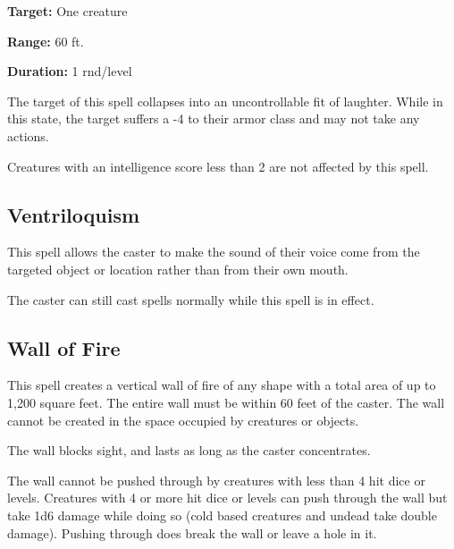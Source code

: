 \begin{multicols*}{2}
{\textbf{Target:} One creature

\textbf{Range:} 60 ft.

\textbf{Duration:} 1 rnd/level}

The target of this spell collapses into an uncontrollable fit of laughter. While in this state, the target suffers a -4 to their armor class and may not take any actions.

Creatures with an intelligence score less than 2 are not affected by this spell.

\subsection{Ventriloquism}\label{spell:Ventriloquism}

This spell allows the caster to make the sound of their voice come from the targeted object or location rather than from their own mouth.

The caster can still cast spells normally while this spell is in effect.

\subsection{Wall of Fire}\label{spell:Wall of Fire}

This spell creates a vertical wall of fire of any shape with a total area of up to 1,200 square feet. The entire wall must be within 60 feet of the caster. The wall cannot be created in the space occupied by creatures or objects.

The wall blocks sight, and lasts as long as the caster concentrates.

The wall cannot be pushed through by creatures with less than 4 hit dice or levels. Creatures with 4 or more hit dice or levels can push through the wall but take 1d6 damage while doing so (cold based creatures and undead take double damage). Pushing through does break the wall or leave a hole in it.


\end{multicols*}
